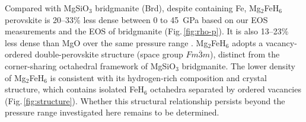 \documentclass[draft,jgrga,12pt]{agujournal2019}
\begin{document}
Compared with MgSiO$_3$ bridgmanite (Brd), despite containing Fe, Mg$_2$FeH$_6$ perovskite is 20--33\% less dense between 0 to 45~{GPa} based on our EOS measurements and the EOS of bridgmanite \cite{tange_pvt_2012} (Fig.\,\ref{fig:rho-p}). 
It is also 13--23\% less dense than MgO over the same pressure range \cite{dorogokupets_equations_2007}.
Mg$_2$FeH$_6$ adopts a vacancy-ordered double-perovskite structure (space group $Fm\overline{3}m$), distinct from the corner-sharing octahedral framework of MgSiO$_3$ bridgmanite.
The lower density of Mg$_2$FeH$_6$ is consistent with its hydrogen-rich composition and crystal structure, which contains isolated FeH$_6$ octahedra separated by ordered vacancies (Fig.\,\ref{fig:structure}). 
Whether this structural relationship persists beyond the pressure range investigated here remains to be determined.




\end{document}

